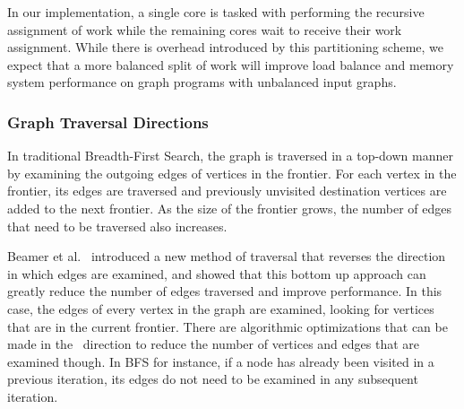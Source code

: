In our implementation, a single core is tasked with performing the recursive assignment of work while the remaining cores wait to receive their work assignment. 
While there is overhead introduced by this partitioning scheme, we expect that a more balanced split of work will improve load balance and memory system performance on graph programs with unbalanced input graphs.





\subsubsection{Graph Traversal Directions}

\pushVPullMethodFigure

In traditional Breadth-First Search, the graph is traversed in a top-down manner by examining the outgoing edges of vertices in the frontier.
For each vertex in the frontier, its edges are traversed and previously unvisited destination vertices are added to the next frontier.
As the size of the frontier grows, the number of edges that need to be traversed also increases.

Beamer et al.~\cite{beamer-bfs-direction} introduced a new method of traversal that reverses the direction in which edges are examined, and showed that this bottom up \pull approach can greatly reduce the number of edges traversed and improve performance. 
In this case, the edges of every vertex in the graph are examined, looking for vertices that are in the current frontier.
There are algorithmic optimizations that can be made in the \pull~direction to reduce the number of vertices and edges that are examined though. 
In BFS for instance, if a node has already been visited in a previous iteration, its edges do not need to be examined in any subsequent iteration.

